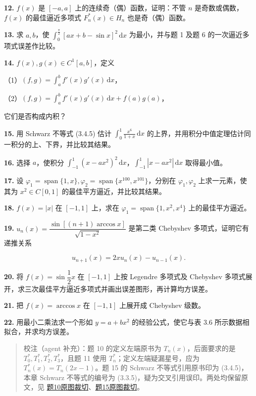 \documentclass[
  10pt,
  fontset=fandol]{ctexart}
\begin{document}
\textbf{12.} \(f(x)\) 是 \([-a,a]\) 上的连续奇（偶）函数，证明：不管 \(n\) 是奇数或偶数，\(f(x)\) 的最佳逼近多项式 \(F_n^*(x)\in H_n\) 也是奇（偶）函数。

\textbf{13.} 求 \(a,b\)，使 \(\displaystyle\int_0^{\frac\pi2}[ax+b-\sin x]^2\,\mathrm dx\) 为最小，并与题 1 及题 6 的一次逼近多项式误差作比较。

\textbf{14.} \(f(x),g(x)\in C^1[a,b]\)，定义

（1）\((f,g)=\displaystyle\int_a^b f'(x)g'(x)\,\mathrm dx\)，

（2）\((f,g)=\displaystyle\int_a^b f'(x)g'(x)\,\mathrm dx+f(a)g(a)\)，

它们是否构成内积？

\textbf{15.} 用 Schwarz 不等式 (3.4.5) 估计 \(\displaystyle\int_0^1\frac{x^6}{1+x}\,\mathrm dx\) 的上界，并用积分中值定理估计同一积分的上、下界，并比较其结果。

\textbf{16.} 选择 \(a\)，使积分 \(\displaystyle\int_{-1}^1(x-ax^2)^2\,\mathrm dx\)，\(\displaystyle\int_{-1}^1|x-ax^2|\,\mathrm dx\) 取得最小值。

\textbf{17.} 设 \(\varphi_1=\operatorname{span}\{1,x\},\varphi_2=\operatorname{span}\{x^{100},x^{101}\}\)，分别在 \(\varphi_1,\varphi_2\) 上求一元素，使其为 \(x^2\in C[0,1]\) 的最佳平方逼近，并比较其结果。

\textbf{18.} \(f(x)=|x|\) 在 \([-1,1]\) 上，求在 \(\varphi_1=\operatorname{span}\{1,x^2,x^4\}\) 上的最佳平方逼近。

\textbf{19.} \(u_n(x)=\dfrac{\sin[(n+1)\arccos x]}{\sqrt{1-x^2}}\) 是第二类 Chebyshev 多项式，证明它有递推关系

\[
u_{n+1}(x)=2xu_n(x)-u_{n-1}(x).
\]

\textbf{20.} 将 \(f(x)=\sin\dfrac12x\) 在 \([-1,1]\) 上按 Legendre 多项式及 Chebyshev 多项式展开，求三次最佳平方逼近多项式并画出误差图形，再计算均方误差。

\textbf{21.} 把 \(f(x)=\arccos x\) 在 \([-1,1]\) 上展开成 Chebyshev 级数。

\textbf{22.} 用最小二乘法求一个形如 \(y=a+bx^2\) 的经验公式，使它与表 3.6 所示数据相拟合，并求均方误差。

\begin{quote}
校注（agent 补充）：题 10 的定义左端原书为 \(T_n(x)\)，后面要求的是 \(T_0^*,T_1^*,T_2^*,T_3^*\)，且题 11 使用 \(T_n^*\)；定义左端疑漏星号，应为 \(T_n^*(x)=T_n(2x-1)\)。题 15 的 Schwarz 不等式引用原书印为 (3.4.5)，本章 Schwarz 不等式的编号为 (3.3.5)，疑为交叉引用误印。两处均保留原文，见 \href{../assets/ch03b/p091-exercise-10.png}{题10原图裁切}、\href{../assets/ch03b/p091-exercise-15.png}{题15原图裁切}。
\end{quote}
\end{document}
